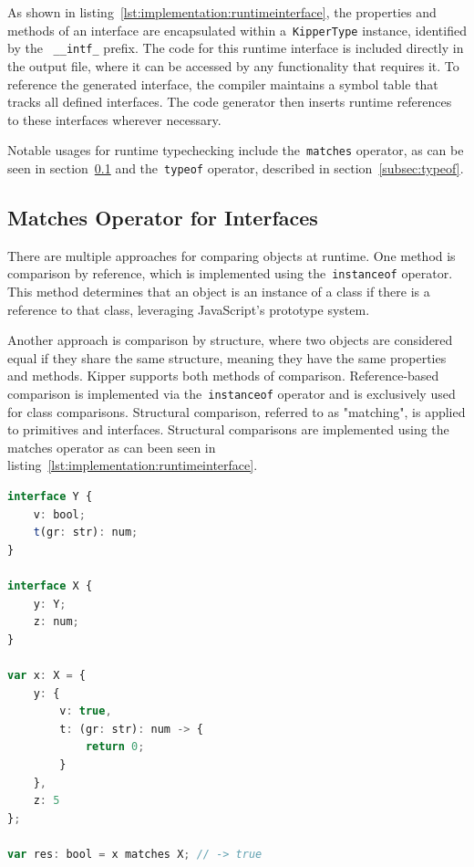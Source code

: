 As shown in listing~\ref{lst:implementation:runtimeinterface}, the properties and methods of an interface are encapsulated within a~\lstinline|KipperType| instance, identified by the ~\lstinline|__intf_| prefix. The code for this runtime interface is included directly in the output file, where it can be accessed by any functionality that requires it. To reference the generated interface, the compiler maintains a symbol table that tracks all defined interfaces. The code generator then inserts runtime references to these interfaces wherever necessary.

Notable usages for runtime typechecking include the~\lstinline|matches| operator, as can be seen in section~\ref{subsec:matches} and the~\lstinline|typeof| operator, described in section~\ref{subsec:typeof}.

\subsection{Matches Operator for Interfaces}
\label{subsec:matches}

There are multiple approaches for comparing objects at runtime. One method is comparison by reference, which is implemented using the~\lstinline|instanceof| operator. This method determines that an object is an instance of a class if there is a reference to that class, leveraging JavaScript's prototype system.

Another approach is comparison by structure, where two objects are considered equal if they share the same structure, meaning they have the same properties and methods. Kipper supports both methods of comparison. Reference-based comparison is implemented via the~\lstinline|instanceof| operator and is exclusively used for class comparisons. Structural comparison, referred to as "matching", is applied to primitives and interfaces. Structural comparisons are implemented using the matches operator as can been seen in listing~\ref{lst:implementation:runtimeinterface}.

\begin{lstlisting}[language=Typescript,caption=The Kipper matches operator,label=lst:implementation:matchesoperator]
interface Y {
	v: bool;
	t(gr: str): num;
}

interface X {
	y: Y;
	z: num;
}

var x: X = {
	y: {
		v: true,
		t: (gr: str): num -> {
			return 0;
		}
	},
	z: 5
};

var res: bool = x matches X; // -> true
\end{lstlisting}

